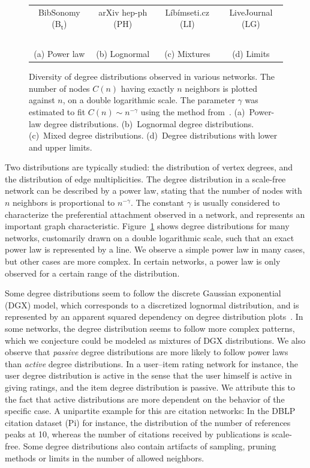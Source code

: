 \documentclass[11pt,a4paper]{book}
\begin{document}
\begin{figure}[h!]
\begin{tabular}{c c c c}
    BibSonomy (\textsf{B$_\textsf{t}$}) &
    arXiv hep-ph (\textsf{PH}) & 
    Líbímseti.cz (\textsf{LI}) &
    LiveJournal (\textsf{LG}) \\
    \, \\
    (a) Power law &
    (b) Lognormal &
    (c) Mixtures &
    (d) Limits 
  \end{tabular}

  \caption[Diversity of degree distributions.]{
    Diversity of degree distributions observed in various networks.  
    The number of nodes $C(n)$ having exactly $n$ neighbors is
    plotted against $n$, on a double logarithmic scale. 
    The parameter $\gamma$ was estimated to fit $C(n) \sim n^{-\gamma}$
    using the method from~\cite{b408}.
    (a)~Power-law degree distributions.  
    (b)~Lognormal degree distributions.
    (c)~Mixed degree distributions.
    (d)~Degree distributions with lower and upper limits.
  }
  \label{fig:degree-distributions}
\end{figure}

Two distributions are typically studied: the distribution of vertex
degrees, and the distribution of edge multiplicities.  The degree
distribution in a scale-free network can be described by a power law,
stating that the number of nodes with $n$ neighbors is proportional to
$n^{-\gamma}$.  The constant $\gamma$ is
usually considered to characterize the preferential attachment
observed in a network, and represents an important graph characteristic.
Figure~\ref{fig:degree-distributions} shows degree
distributions for many networks, customarily drawn on a double
logarithmic scale, such that an exact power law is represented by a
line.  We observe a simple power law in many cases, but other
cases are more complex.  In certain networks, a power law is only observed for
a certain range of the distribution.  

Some degree distributions seem to
follow the discrete Gaussian exponential (DGX) model, which
corresponds to a discretized 
lognormal distribution, and is represented by an apparent squared
dependency on degree distribution plots~\cite{b319}.  In some networks,
the degree distribution seems to follow more complex patterns, which we
conjecture could be modeled as mixtures of DGX distributions.  We also
observe that \emph{passive} degree distributions are more likely to follow
power laws than \emph{active} degree distributions.  In a user--item rating
network for instance, the user degree distribution is active in the
sense that the user himself is active in giving ratings, and the item
degree distribution is passive.  We attribute this to the fact that 
active distributions are more dependent on the behavior of the
specific case.  
A unipartite example for this are citation
networks: 
In the DBLP citation dataset (\textsf{Pi}) for instance, the
distribution of the number of references peaks at 10,
whereas the number of
citations received by publications is scale-free.  
Some degree
distributions also contain artifacts of sampling, pruning methods or
limits in the number of allowed neighbors.
\end{document}

